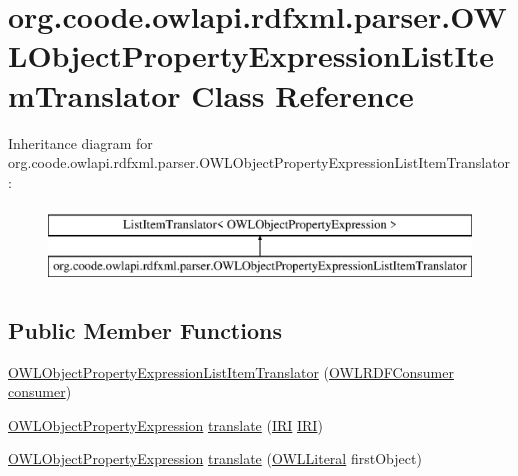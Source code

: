 \hypertarget{classorg_1_1coode_1_1owlapi_1_1rdfxml_1_1parser_1_1_o_w_l_object_property_expression_list_item_translator}{\section{org.\-coode.\-owlapi.\-rdfxml.\-parser.\-O\-W\-L\-Object\-Property\-Expression\-List\-Item\-Translator Class Reference}
\label{classorg_1_1coode_1_1owlapi_1_1rdfxml_1_1parser_1_1_o_w_l_object_property_expression_list_item_translator}
}
Inheritance diagram for org.\-coode.\-owlapi.\-rdfxml.\-parser.\-O\-W\-L\-Object\-Property\-Expression\-List\-Item\-Translator\-:\begin{figure}[H]
\begin{center}
\leavevmode
\includegraphics[height=2.000000cm]{classorg_1_1coode_1_1owlapi_1_1rdfxml_1_1parser_1_1_o_w_l_object_property_expression_list_item_translator}
\end{center}
\end{figure}
\subsection*{Public Member Functions}
\begin{DoxyCompactItemize}
\item 
\hyperlink{classorg_1_1coode_1_1owlapi_1_1rdfxml_1_1parser_1_1_o_w_l_object_property_expression_list_item_translator_a1c267267926fec731b1ff7b3fb6d54aa}{O\-W\-L\-Object\-Property\-Expression\-List\-Item\-Translator} (\hyperlink{classorg_1_1coode_1_1owlapi_1_1rdfxml_1_1parser_1_1_o_w_l_r_d_f_consumer}{O\-W\-L\-R\-D\-F\-Consumer} \hyperlink{classorg_1_1coode_1_1owlapi_1_1rdfxml_1_1parser_1_1_o_w_l_object_property_expression_list_item_translator_af211e5e3c6169df55f5ed609f0222850}{consumer})
\item 
\hyperlink{interfaceorg_1_1semanticweb_1_1owlapi_1_1model_1_1_o_w_l_object_property_expression}{O\-W\-L\-Object\-Property\-Expression} \hyperlink{classorg_1_1coode_1_1owlapi_1_1rdfxml_1_1parser_1_1_o_w_l_object_property_expression_list_item_translator_a780a3c0f8991cee1967dd52137c6940b}{translate} (\hyperlink{classorg_1_1semanticweb_1_1owlapi_1_1model_1_1_i_r_i}{I\-R\-I} \hyperlink{classorg_1_1semanticweb_1_1owlapi_1_1model_1_1_i_r_i}{I\-R\-I})
\item 
\hyperlink{interfaceorg_1_1semanticweb_1_1owlapi_1_1model_1_1_o_w_l_object_property_expression}{O\-W\-L\-Object\-Property\-Expression} \hyperlink{classorg_1_1coode_1_1owlapi_1_1rdfxml_1_1parser_1_1_o_w_l_object_property_expression_list_item_translator_a4b55b15e48876310290fa1420e89e4ed}{translate} (\hyperlink{interfaceorg_1_1semanticweb_1_1owlapi_1_1model_1_1_o_w_l_literal}{O\-W\-L\-Literal} first\-Object)
\end{DoxyCompactItemize}
